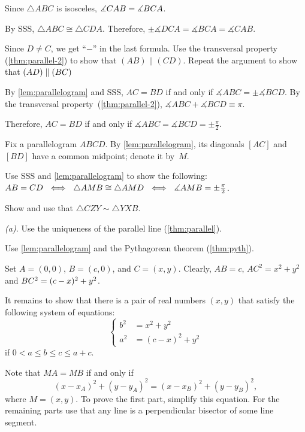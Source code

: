 Since $\triangle ABC$ is isosceles, $\measuredangle CAB=\measuredangle BCA$.
 
By SSS, $\triangle ABC\cong \triangle CDA$.
Therefore, 
$\pm\measuredangle DCA= \measuredangle BCA=\measuredangle CAB$.

Since $D\ne C$, we get ``$-$'' in the last formula.
Use the transversal property (\ref{thm:parallel-2}) to show that $(AB)\parallel (CD)$. Repeat the argument to show that $(AD)\parallel(BC)$ 

By \ref{lem:parallelogram} and SSS, 
$AC=BD$
if and only if
$\measuredangle ABC=\pm \measuredangle BCD$.
By the transversal property~(\ref{thm:parallel-2}), 
$\measuredangle ABC+\measuredangle BCD\equiv \pi$.

Therefore, 
$AC=BD$
if and only if
$\measuredangle ABC
=\measuredangle BCD
=\pm\tfrac\pi2$.

Fix a parallelogram $ABCD$.
By \ref{lem:parallelogram},
its diagonals $[AC]$ and $[BD]$ have a common midpoint; denote it by~$M$.

Use SSS and \ref{lem:parallelogram} to show the following:
$AB=CD\ \iff\ \triangle AMB
\cong
\triangle AMD\ \iff\ \measuredangle AMB
=
\pm\tfrac\pi2$.

Show and use that $\triangle CZY\sim\triangle YXB$.

 \textit{(a).} Use the uniqueness of the parallel line (\ref{thm:parallel}).

 Use \ref{lem:parallelogram} and the Pythagorean theorem (\ref{thm:pyth}).

Set $A=(0,0)$, $B=(c,0)$, and $C=(x,y)$.
Clearly, $AB=c$,
$AC^2=x^2+y^2$ and $BC^2=(c-x)^2+y^2$.

It remains to show that there is a pair of real numbers $(x,y)$ 
that satisfy the following system of equations:
$$
\left\{
\begin{aligned}
b^2&=x^2+y^2
\\
a^2&=(c-x)^2+y^2
\end{aligned}
\right.
$$
if $0<a\le b\le c\le a+c$.

 Note that $MA=MB$ if and only if
\[(x-x_A)^2+(y-y_A)^2=(x-x_B)^2+(y-y_B)^2,\]
where $M=(x,y)$. 
To prove the first part, simplify this equation.
For the remaining parts use that any line is a perpendicular bisector of some line segment.

